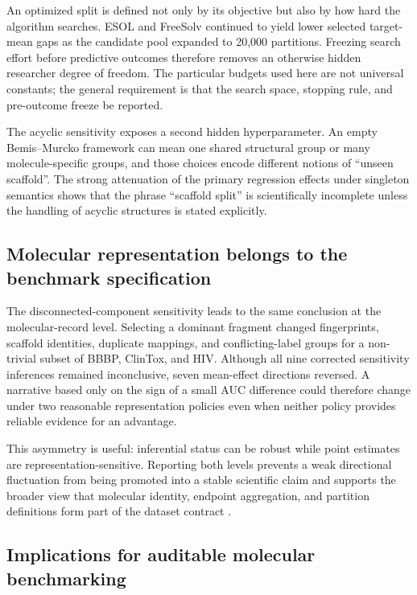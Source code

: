 An optimized split is defined not only by its objective but also by how hard the algorithm searches. ESOL and FreeSolv continued to yield lower selected target-mean gaps as the candidate pool expanded to 20,000 partitions. Freezing search effort before predictive outcomes therefore removes an otherwise hidden researcher degree of freedom. The particular budgets used here are not universal constants; the general requirement is that the search space, stopping rule, and pre-outcome freeze be reported.

The acyclic sensitivity exposes a second hidden hyperparameter. An empty Bemis--Murcko framework can mean one shared structural group or many molecule-specific groups, and those choices encode different notions of ``unseen scaffold''. The strong attenuation of the primary regression effects under singleton semantics shows that the phrase ``scaffold split'' is scientifically incomplete unless the handling of acyclic structures is stated explicitly.

\subsection{Molecular representation belongs to the benchmark specification}

The disconnected-component sensitivity leads to the same conclusion at the molecular-record level. Selecting a dominant fragment changed fingerprints, scaffold identities, duplicate mappings, and conflicting-label groups for a non-trivial subset of BBBP, ClinTox, and HIV. Although all nine corrected sensitivity inferences remained inconclusive, seven mean-effect directions reversed. A narrative based only on the sign of a small AUC difference could therefore change under two reasonable representation policies even when neither policy provides reliable evidence for an advantage.

This asymmetry is useful: inferential status can be robust while point estimates are representation-sensitive. Reporting both levels prevents a weak directional fluctuation from being promoted into a stable scientific claim and supports the broader view that molecular identity, endpoint aggregation, and partition definitions form part of the dataset contract \citep{nael2026dataset}.

\subsection{Implications for auditable molecular benchmarking}

